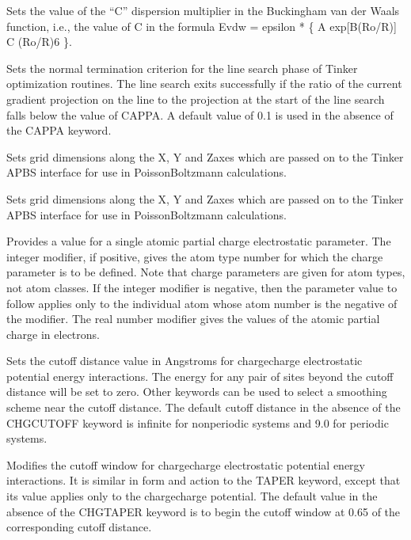\documentclass[letterpaper,11pt,english]{sphinxmanual}
\begin{document}
  Sets the value of the “C” dispersion multiplier in the Buckingham van der Waals function, i.e., the value of C in the formula Evdw = epsilon * \{ A exp{[}\sphinxhyphen{}B(Ro/R){]} \sphinxhyphen{} C (Ro/R)6 \}.

  Sets the normal termination criterion for the line search phase of Tinker optimization routines. The line search exits successfully if the ratio of the current gradient projection on the line to the projection at the start of the line search falls below the value of CAPPA. A default value of 0.1 is used in the absence of the CAPPA keyword.

  Sets grid dimensions along the X\sphinxhyphen{}, Y\sphinxhyphen{} and Z\sphinxhyphen{}axes which are passed on to the Tinker APBS interface for use in Poisson\sphinxhyphen{}Boltzmann calculations.

  Sets grid dimensions along the X\sphinxhyphen{}, Y\sphinxhyphen{} and Z\sphinxhyphen{}axes which are passed on to the Tinker APBS interface for use in Poisson\sphinxhyphen{}Boltzmann calculations.

  Provides a value for a single atomic partial charge electrostatic parameter. The integer modifier, if positive, gives the atom type number for which the charge parameter is to be defined. Note that charge parameters are given for atom types, not atom classes. If the integer modifier is negative, then the parameter value to follow applies only to the individual atom whose atom number is the negative of the modifier. The real number modifier gives the values of the atomic partial charge in electrons.

  Sets the cutoff distance value in Angstroms for charge\sphinxhyphen{}charge electrostatic potential energy interactions. The energy for any pair of sites beyond the cutoff distance will be set to zero. Other keywords can be used to select a smoothing scheme near the cutoff distance. The default cutoff distance in the absence of the CHG\sphinxhyphen{}CUTOFF keyword is infinite for nonperiodic systems and 9.0 for periodic systems.


  Modifies the cutoff window for charge\sphinxhyphen{}charge electrostatic potential energy interactions. It is similar in form and action to the TAPER keyword, except that its value applies only to the charge\sphinxhyphen{}charge potential. The default value in the absence of the CHG\sphinxhyphen{}TAPER keyword is to begin the cutoff window at 0.65 of the corresponding cutoff distance.
\end{document}
